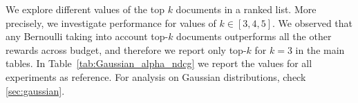 \begin{table}[ht]
  \centering
  \setlength{\tabcolsep}{3.5pt}
  \renewcommand{\arraystretch}{1.2}
  \caption{Comparison of $\alpha$-nDCG for NeuCLIR24 and ResearcyQuestions. Gaussian vs.\ Bernoulli modelling.}
  \label{tab:Gaussian_alpha_ndcg}
\end{table}

 We explore different values of the top \(k\) documents in a ranked list. More precisely, we investigate performance for values of \(k \in [3, 4, 5]\). We observed that any Bernoulli taking into account top-$k$ documents outperforms all the other rewards across budget, and therefore we report only top-$k$ for $k = 3$ in the main tables. In Table~\ref{tab:Gaussian_alpha_ndcg} we report the values for all experiments as reference. For analysis on Gaussian distributions, check \ref{sec:gaussian}.

